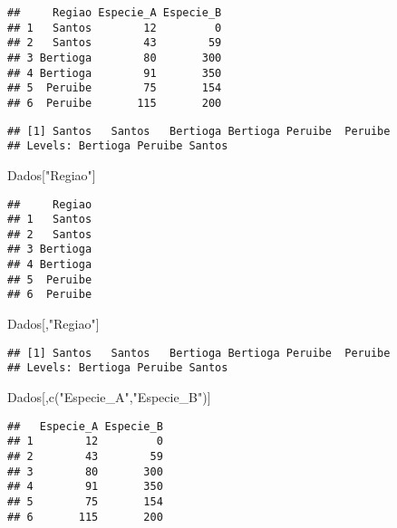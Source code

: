 \documentclass[
]{book}
\newenvironment{Shaded}{\begin{snugshade}}{\end{snugshade}}
\newcommand{\FunctionTok}[1]{\textcolor[rgb]{0.00,0.00,0.00}{#1}}
\newcommand{\NormalTok}[1]{#1}
\newcommand{\SpecialCharTok}[1]{\textcolor[rgb]{0.00,0.00,0.00}{#1}}
\newcommand{\StringTok}[1]{\textcolor[rgb]{0.31,0.60,0.02}{#1}}
\begin{document}
\begin{verbatim}
##     Regiao Especie_A Especie_B
## 1   Santos        12         0
## 2   Santos        43        59
## 3 Bertioga        80       300
## 4 Bertioga        91       350
## 5  Peruibe        75       154
## 6  Peruibe       115       200
\end{verbatim}

\begin{Shaded}
\end{Shaded}

\begin{verbatim}
## [1] Santos   Santos   Bertioga Bertioga Peruibe  Peruibe 
## Levels: Bertioga Peruibe Santos
\end{verbatim}

\begin{Shaded}
\begin{Highlighting}[]
\NormalTok{Dados[}\StringTok{"Regiao"}\NormalTok{]}
\end{Highlighting}
\end{Shaded}

\begin{verbatim}
##     Regiao
## 1   Santos
## 2   Santos
## 3 Bertioga
## 4 Bertioga
## 5  Peruibe
## 6  Peruibe
\end{verbatim}

\begin{Shaded}
\begin{Highlighting}[]
\NormalTok{Dados[,}\StringTok{"Regiao"}\NormalTok{]}
\end{Highlighting}
\end{Shaded}

\begin{verbatim}
## [1] Santos   Santos   Bertioga Bertioga Peruibe  Peruibe 
## Levels: Bertioga Peruibe Santos
\end{verbatim}

\begin{Shaded}
\begin{Highlighting}[]
\NormalTok{Dados[,}\FunctionTok{c}\NormalTok{(}\StringTok{"Especie\_A"}\NormalTok{,}\StringTok{"Especie\_B"}\NormalTok{)]}
\end{Highlighting}
\end{Shaded}

\begin{verbatim}
##   Especie_A Especie_B
## 1        12         0
## 2        43        59
## 3        80       300
## 4        91       350
## 5        75       154
## 6       115       200
\end{verbatim}
\end{document}
